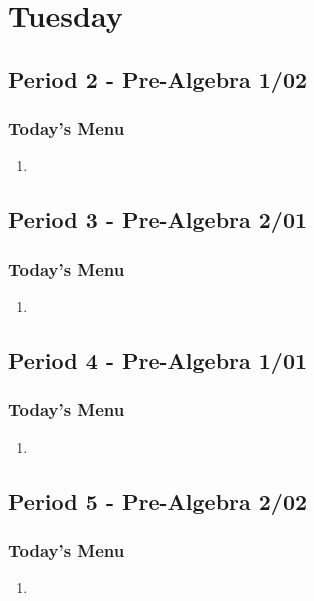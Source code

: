    	 \section[Tue]{Tuesday}
   	  \subsection[PA1/02]{Period 2 - Pre-Algebra 1/02}
   	    \begin{frame}[label=PA1_02]
   	    \frametitle{Today's Menu}
   	    
   	     \begin{enumerate}
   	   	   \item
   	   	   \rightarrowitem
   	     \end{enumerate}
   	  
     	\end{frame}
   	  \subsection[PA2/01]{Period 3 - Pre-Algebra 2/01}
   	 \begin{frame}[label=PA2_01]
   	 	\frametitle{Today's Menu}
   	 	
   	 	 \begin{enumerate}
   	   	   \item
   	   	   \rightarrowitem
   	     \end{enumerate}
   	       	 
   	 \end{frame}
   	 \subsection[PA1/01]{Period 4 - Pre-Algebra 1/01}
   	 \begin{frame}[label=PA1_01]
   	 	\frametitle{Today's Menu}
   	 	
   	 	 \begin{enumerate}
   	   	   \item
   	   	   \rightarrowitem
   	     \end{enumerate}
   	 	
   	 \end{frame}
   	 \subsection[PA2/02]{Period 5 - Pre-Algebra 2/02}
   	 \begin{frame}[label=PA2_02]
   	 	\frametitle{Today's Menu}
   	 	
   	 	 \begin{enumerate}
   	   	   \item
   	   	   \rightarrowitem
   	     \end{enumerate}
   	 
   	 \end{frame}
   	 
